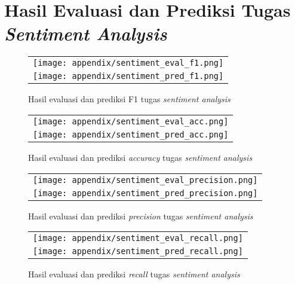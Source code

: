 \chapter{Hasil Evaluasi dan Prediksi Tugas \textit{Sentiment Analysis}}
\label{appendix:sentiment}

\begin{figure}[h]
    \centering
    \begin{longtable}{c}
        \texttt{[image: appendix/sentiment\_eval\_f1.png]} \\
        \texttt{[image: appendix/sentiment\_pred\_f1.png]} \\
    \end{longtable}
    \caption{Hasil evaluasi dan prediksi F1 tugas \textit{sentiment analysis}}
\end{figure}

\begin{figure}[h]
    \centering
    \begin{longtable}{c}
        \texttt{[image: appendix/sentiment\_eval\_acc.png]} \\
        \texttt{[image: appendix/sentiment\_pred\_acc.png]} \\
    \end{longtable}
    \caption{Hasil evaluasi dan prediksi \textit{accuracy} tugas \textit{sentiment analysis}}
\end{figure}

\begin{figure}[h]
    \centering
    \begin{longtable}{c}
        \texttt{[image: appendix/sentiment\_eval\_precision.png]} \\
        \texttt{[image: appendix/sentiment\_pred\_precision.png]} \\
    \end{longtable}
    \caption{Hasil evaluasi dan prediksi \textit{precision} tugas \textit{sentiment analysis}}
\end{figure}

\begin{figure}[h]
    \centering
    \begin{longtable}{c}
        \texttt{[image: appendix/sentiment\_eval\_recall.png]} \\
        \texttt{[image: appendix/sentiment\_pred\_recall.png]} \\
    \end{longtable}
    \caption{Hasil evaluasi dan prediksi \textit{recall} tugas \textit{sentiment analysis}}
\end{figure}

